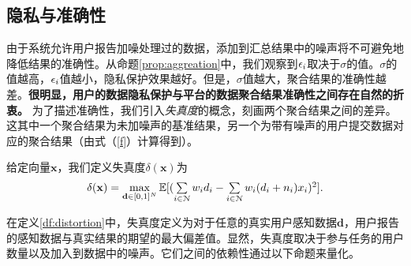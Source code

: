 	\subsection{隐私与准确性}\label{sec:pvsa}
	由于系统允许用户报告加噪处理过的数据，添加到汇总结果中的噪声将不可避免地降低结果的准确性。从命题\ref{prop:aggreation}中，我们观察到$\epsilon_i$取决于$\sigma$的值。$\sigma$的值越高，$\epsilon_i$值越小，隐私保护效果越好。但是，$\sigma$值越大，聚合结果的准确性越差。{\kaishu\bfseries 很明显，用户的数据隐私保护与平台的数据聚合结果准确性之间存在自然的折衷。}
	为了描述准确性，我们引入\textit{失真度}的概念，刻画两个聚合结果之间的差异。这其中一个聚合结果为未加噪声的基准结果，另一个为带有噪声的用户提交数据对应的聚合结果（由式（\ref{f}）计算得到）。
	
	\begin{df}[失真度]\label{df:distortion}
		给定向量$\mathbf{x}$，我们定义失真度$\delta(\mathbf{x})$为
		\begin{equation}\label{eq:distortion}
		\begin{array}
		[c]{lll}%
		\delta(\mathbf{x})=\max\limits_{\mathbf{d}\in[0,1]^N}\mathbb{E}[(\sum\limits_{i\in\N}w_id_i-\sum\limits_{i\in\N}w_i(d_i+n_i)x_i)^2].
		\end{array}
		\end{equation}
	\end{df}
	在定义\ref{df:distortion}中，失真度定义为对于任意的真实用户感知数据$\mathbf{d}$，用户报告的感知数据与真实结果的期望的最大偏差值。显然，失真度取决于参与任务的用户数量以及加入到数据中的噪声。它们之间的依赖性通过以下命题来量化。
	
